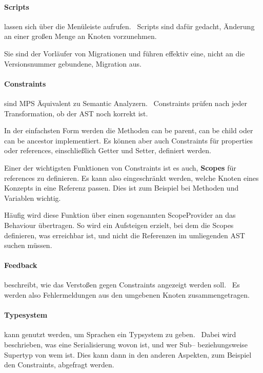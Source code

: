 \paragraph{Scripts} lassen sich über die Menüleiste aufrufen.~\autocite{jetbrains-sro-no-dateO}
Scripts sind dafür gedacht, Änderung an einer großen Menge an Knoten vorzunehmen.

Sie sind der Vorläufer von Migrationen und führen effektiv eine, nicht an die Versionsnummer gebundene, Migration aus.

\paragraph{Constraints} sind \ac{MPS} Äquivalent zu Semantic Analyzern.~\autocite{jetbrains-sro-no-dateP}
Constraints prüfen nach jeder Transformation, ob der \ac{AST} noch korrekt ist.

In der einfachsten Form werden die Methoden {\ttfamily can be parent}, {\ttfamily can be child} oder {\ttfamily can be ancestor} implementiert.
Es können aber auch Constraints für {\ttfamily properties} oder {\ttfamily references}, einschließlich Getter und Setter, definiert werden.

Einer der wichtigsten Funktionen von Constraints ist es auch, \textbf{Scopes} für {\ttfamily references} zu definieren.
Es kann also eingeschränkt werden, welche Knoten eines Konzepts in eine Referenz passen.
Dies ist zum Beispiel bei Methoden und Variablen wichtig.

Häufig wird diese Funktion über einen sogenannten {\ttfamily ScopeProvider} an das Behaviour übertragen.
So wird ein Aufsteigen erzielt, bei dem die Scopes definieren, was erreichbar ist, und nicht die Referenzen im umliegenden \ac{AST} suchen müssen.

\paragraph{Feedback} beschreibt, wie das Verstoßen gegen Constraints angezeigt werden soll.~\autocite{jetbrains-sro-no-dateQ}
Es werden also Fehlermeldungen aus den umgebenen Knoten zusammengetragen.

\paragraph{Typesystem} kann genutzt werden, um Sprachen ein Typsystem zu geben.~\autocite{jetbrains-sro-no-dateR}
Dabei wird beschrieben, was eine Serialisierung wovon ist, und wer Sub-- beziehungsweise Supertyp von wem ist.
Dies kann dann in den anderen Aspekten, zum Beispiel den Constraints, abgefragt werden.

